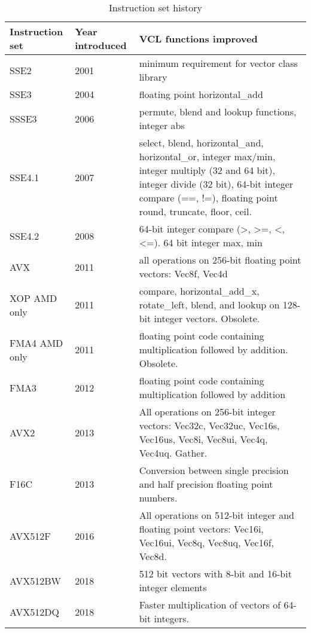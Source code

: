 \documentclass[vcl_manual.tex]{subfiles}
\begin{document}
\begin {table}[h]
\caption{Instruction set history}
\label{table:instructionSetHistory}
\begin{tabular}{|p{24mm}|p{22mm}|p{100mm}|}
\hline
\bfseries Instruction \newline set & \bfseries Year \newline introduced & \bfseries VCL functions improved \\ \hline
SSE2 & 2001 & minimum requirement for vector class library \\ \hline
SSE3 & 2004 & floating point horizontal\_add \\ \hline
SSSE3 & 2006 & permute, blend and lookup functions, integer abs \\ \hline
SSE4.1 & 2007 & select, blend, horizontal\_and, horizontal\_or, integer max/min, integer multiply (32 and 64 bit), integer divide (32 bit), 64-bit integer compare (==, !=), floating point round, truncate, floor, ceil. \\ \hline
SSE4.2 & 2008 & 64-bit integer compare (\textgreater, \textgreater =, \textless, \textless =). 64 bit integer max, min \\ \hline
AVX & 2011 & all operations on 256-bit floating point vectors: Vec8f, Vec4d \\ \hline
XOP \newline AMD only & 2011 & compare, horizontal\_add\_x, rotate\_left, blend, and lookup on 128-bit integer vectors. Obsolete. \\ \hline
FMA4 \newline AMD only & 2011 & floating point code containing multiplication followed by addition. Obsolete. \\ \hline
FMA3 & 2012 & floating point code containing multiplication followed by addition \\ \hline
AVX2 & 2013 & All operations on 256-bit integer vectors: Vec32c, Vec32uc, Vec16s, Vec16us, Vec8i, Vec8ui, Vec4q, Vec4uq. Gather. \\ \hline
F16C & 2013 & Conversion between single precision and half precision floating point numbers. \\ \hline
AVX512F & 2016 & All operations on 512-bit integer and floating point vectors: Vec16i, Vec16ui, Vec8q, Vec8uq, Vec16f, Vec8d. \\ \hline
AVX512BW & 2018 & 512 bit vectors with 8-bit and 16-bit integer elements \\ \hline
AVX512DQ & 2018 & Faster multiplication of vectors of 64-bit integers. \\ \hline

\end{tabular}
\end{table}
\end{document}
